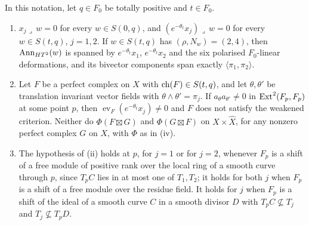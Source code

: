 \begin{theorem}
\label{thm:quarticlocal}
In this notation, let $q\in F_{0}$ be totally positive and $t\in F_{0}$.
\begin{enumerate}[label=\textup{(\roman*)},leftmargin=2.6em,itemsep=2pt]
\item $x_{j}\lrcorner\,w=0$ for every $w\in S(0,q)$, and
  $(e^{-\theta_{t}}x_{j})\lrcorner\,w=0$ for every $w\in S(t,q)$, $j=1,2$. If
  $w\in S(t,q)$ has $(\rho,N_{w})=(2,4)$, then $\operatorname{Ann}_{HT^{2}}(w)$ is spanned
  by $e^{-\theta_{t}}x_{1}$, $e^{-\theta_{t}}x_{2}$ and the six polarised
  $F_{0}$-linear deformations, and its bivector components span exactly
  $\langle\pi_{1},\pi_{2}\rangle$.
\item Let $F$ be a perfect complex on $X$ with $\operatorname{ch}(F)\in S(t,q)$, and let
  $\theta,\theta'$ be translation invariant vector fields with
  $\theta\wedge\theta'=\pi_{j}$. If $a_{\theta}a_{\theta'}\ne0$ in
  $\operatorname{Ext}^{2}(F_{p},F_{p})$ at some point $p$, then
  $\operatorname{ev}_{F}(e^{-\theta_{t}}x_{j})\ne0$ and $F$ does not satisfy the
  weakened criterion. Neither do $\Phi(F\boxtimes G)$ and $\Phi(G\boxtimes F)$
  on $X\times\widehat X$, for any nonzero perfect complex $G$ on $X$, with
  $\Phi$ as in (iv).
\item The hypothesis of \textup{(ii)} holds at $p$, for $j=1$ or for $j=2$,
  whenever $F_{p}$ is a shift of a free module of positive rank over the
  local ring of a smooth curve through $p$, since $T_{p}C$ lies in at most one
  of $T_{1},T_{2}$; it holds for both $j$ when $F_{p}$ is a shift of a free
  module over the residue field. It holds for $j$ when $F_{p}$ is a shift of
  the ideal of a smooth curve $C$ in a smooth divisor $D$ with
  $T_{p}C\not\subseteq T_{j}$ and $T_{j}\not\subseteq T_{p}D$.
\end{enumerate}
\end{theorem}

